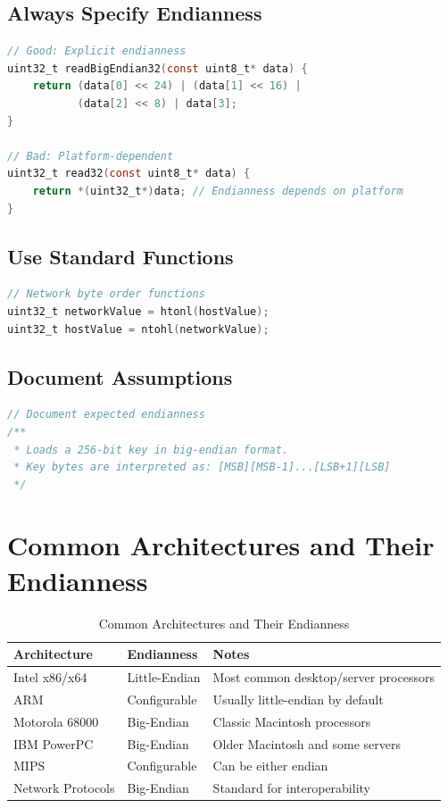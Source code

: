 \documentclass[11pt,a4paper]{article}
\begin{document}
\subsection{Always Specify Endianness}

\begin{lstlisting}[language=C, caption=Explicit vs Platform-dependent Endianness]
// Good: Explicit endianness
uint32_t readBigEndian32(const uint8_t* data) {
    return (data[0] << 24) | (data[1] << 16) | 
           (data[2] << 8) | data[3];
}

// Bad: Platform-dependent
uint32_t read32(const uint8_t* data) {
    return *(uint32_t*)data; // Endianness depends on platform
}
\end{lstlisting}

\subsection{Use Standard Functions}

\begin{lstlisting}[language=C, caption=Network Byte Order Functions]
// Network byte order functions
uint32_t networkValue = htonl(hostValue);
uint32_t hostValue = ntohl(networkValue);
\end{lstlisting}

\subsection{Document Assumptions}

\begin{lstlisting}[language=C, caption=Documenting Endianness Assumptions]
// Document expected endianness
/**
 * Loads a 256-bit key in big-endian format.
 * Key bytes are interpreted as: [MSB][MSB-1]...[LSB+1][LSB]
 */
\end{lstlisting}

\section{Common Architectures and Their Endianness}

\begin{table}[h]
\centering
\begin{tabular}{|l|l|l|}
\hline
\textbf{Architecture} & \textbf{Endianness} & \textbf{Notes} \\
\hline
Intel x86/x64 & Little-Endian & Most common desktop/server processors \\
\hline
ARM & Configurable & Usually little-endian by default \\
\hline
Motorola 68000 & Big-Endian & Classic Macintosh processors \\
\hline
IBM PowerPC & Big-Endian & Older Macintosh and some servers \\
\hline
MIPS & Configurable & Can be either endian \\
\hline
Network Protocols & Big-Endian & Standard for interoperability \\
\hline
\end{tabular}
\caption{Common Architectures and Their Endianness}
\end{table}
\end{document}
